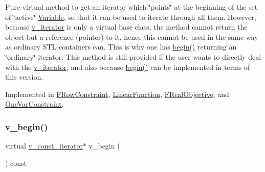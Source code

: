 Pure virtual method to get an iterator which \char`\"{}points\char`\"{} at the beginning of the set of \char`\"{}active\char`\"{} \mbox{\hyperlink{class_s_m_spp__di__unipi__it_1_1_variable}{Variable}}, so that it can be used to iterate through all them. However, because \mbox{\hyperlink{class_s_m_spp__di__unipi__it_1_1_thin_var_dep_interface_1_1v__iterator}{v\+\_\+iterator}} is only a virtual base class, the method cannot return the object but a reference (pointer) to it, hence this cannot be used in the same way as ordinary S\+TL containers can. This is why one has \mbox{\hyperlink{group___thin_var_dep_interface___c_l_a_s_s_e_s_ga79162df6cbf36b4997db545dc30969e2}{begin()}} returning an \char`\"{}ordinary\char`\"{} iterator. This method is still provided if the user wants to directly deal with the \mbox{\hyperlink{class_s_m_spp__di__unipi__it_1_1_thin_var_dep_interface_1_1v__iterator}{v\+\_\+iterator}}, and also because \mbox{\hyperlink{group___thin_var_dep_interface___c_l_a_s_s_e_s_ga79162df6cbf36b4997db545dc30969e2}{begin()}} can be implemented in terms of this version. 

Implemented in \mbox{\hyperlink{class_s_m_spp__di__unipi__it_1_1_f_row_constraint_ad0b5bcf42a678385fdba6fe41ce9626b}{F\+Row\+Constraint}}, \mbox{\hyperlink{class_s_m_spp__di__unipi__it_1_1_linear_function_ab1aaddfcb091477a729de24cd07ad9e5}{Linear\+Function}}, \mbox{\hyperlink{class_s_m_spp__di__unipi__it_1_1_f_real_objective_ad0b5bcf42a678385fdba6fe41ce9626b}{F\+Real\+Objective}}, and \mbox{\hyperlink{class_s_m_spp__di__unipi__it_1_1_one_var_constraint_ad0b5bcf42a678385fdba6fe41ce9626b}{One\+Var\+Constraint}}.

\mbox{\label{group___thin_var_dep_interface___c_l_a_s_s_e_s_ga6179496ecb66b6cc1504a50bcbb264e9}} 
\subsubsection{\texorpdfstring{v\+\_\+begin()}{v\_begin()}\hspace{0.1cm}{\footnotesize\ttfamily [2/2]}}
{\footnotesize\ttfamily virtual \mbox{\hyperlink{class_s_m_spp__di__unipi__it_1_1_thin_var_dep_interface_1_1v__const__iterator}{v\+\_\+const\+\_\+iterator}}$\ast$ v\+\_\+begin (\begin{DoxyParamCaption}\item[{void}]{ }\end{DoxyParamCaption}) const\hspace{0.3cm}{\ttfamily [pure virtual]}}



